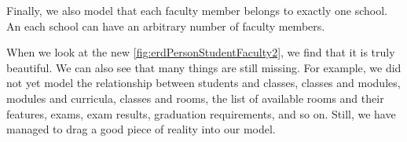 Finally, we also model that each faculty member belongs to exactly one school.
An each school can have an arbitrary number of faculty members.

When we look at the new \cref{fig:erdPersonStudentFaculty2}, we find that it is truly beautiful.
We can also see that many things are still missing.
For example, we did not yet model the relationship between students and classes, classes and modules, modules and curricula, classes and rooms, the list of available rooms and their features, exams, exam results, graduation requirements, and so on.
Still, we have managed to drag a good piece of reality into our model.%
%
\FloatBarrier%
\endhsection%
%
